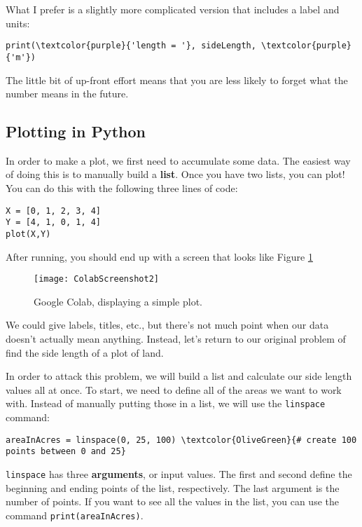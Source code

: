 What I prefer is a slightly more complicated version that includes a label and units:
\begin{Verbatim}[commandchars=\\\{\}]
print(\textcolor{purple}{'length = '}, sideLength, \textcolor{purple}{'m'})   
\end{Verbatim}

The little bit of up-front effort means that you are less likely to forget what the number means in the future.

\subsection{Plotting in Python}

In order to make a plot, we first need to accumulate some data.  The easiest way of doing this is to manually build a {\bf list}.  Once you have two lists, you can plot!  You can do this with the following three lines of code:
\begin{Verbatim}[commandchars=\\\{\}]
X = [0, 1, 2, 3, 4]
Y = [4, 1, 0, 1, 4]
plot(X,Y)
\end{Verbatim}

After running, you should end up with a screen that looks like Figure \ref{fig:ColabScreenshot2}

\begin{figure}[H]
\centering
\texttt{[image: ColabScreenshot2]}
\caption{Google Colab, displaying a simple plot.}
\label{fig:ColabScreenshot2}
\end{figure}

We could give labels, titles, etc., but there's not much point when our data doesn't actually mean anything.  Instead, let's return to our original problem of find the side length of a plot of land.

In order to attack this problem, we will build a list and calculate our side length values all at once.  To start, we need to define all of the areas we want to work with.  Instead of manually putting those in a list, we will use the \texttt{linspace} command:

\begin{Verbatim}[commandchars=\\\{\}]
areaInAcres = linspace(0, 25, 100) \textcolor{OliveGreen}{# create 100 points between 0 and 25}
\end{Verbatim}
\texttt{linspace} has three {\bf arguments}, or input values.  The first and second define the beginning and ending points of the list, respectively.  The last argument is the number of points.  If you want to see all the values in the list, you can use the command \texttt{print(areaInAcres)}.

